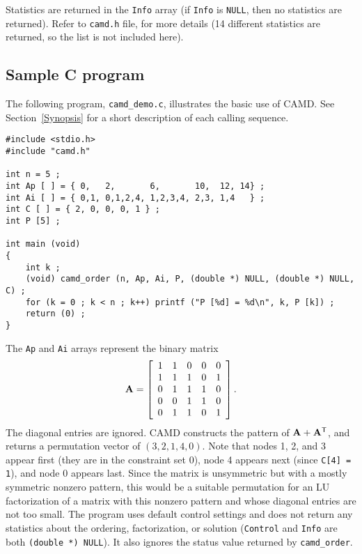 \documentclass[11pt]{article}
\newcommand{\m}[1]{{\bf{#1}}}       %
\newcommand{\tr}{^{\sf T}}          %
\begin{document}
Statistics are returned in the {\tt Info} array
(if {\tt Info} is {\tt NULL}, then no statistics are returned).
Refer to {\tt camd.h} file, for more details
(14 different statistics are returned, so the list is not included here).

\subsection{Sample C program}

The following program, {\tt camd\_demo.c}, illustrates the basic use of CAMD.
See Section~\ref{Synopsis} for a short description
of each calling sequence.

{\footnotesize
\begin{verbatim}
#include <stdio.h>
#include "camd.h"

int n = 5 ;
int Ap [ ] = { 0,   2,       6,       10,  12, 14} ;
int Ai [ ] = { 0,1, 0,1,2,4, 1,2,3,4, 2,3, 1,4   } ;
int C [ ] = { 2, 0, 0, 0, 1 } ;
int P [5] ;

int main (void)
{
    int k ;
    (void) camd_order (n, Ap, Ai, P, (double *) NULL, (double *) NULL, C) ;
    for (k = 0 ; k < n ; k++) printf ("P [%d] = %d\n", k, P [k]) ;
    return (0) ;
}

\end{verbatim}
}

The {\tt Ap} and {\tt Ai} arrays represent the binary matrix
\[
\m{A} = \left[
\begin{array}{rrrrr}
 1 &  1 &  0 &  0 &  0 \\
 1 &  1 &  1 &  0 &  1 \\
 0 &  1 &  1 &  1 &  0 \\
 0 &  0 &  1 &  1 &  0 \\
 0 &  1 &  1 &  0 &  1 \\
\end{array}
\right].
\]
The diagonal entries are ignored.
%
CAMD constructs the pattern of $\m{A}+\m{A}\tr$,
and returns a permutation vector of $(3, 2, 1, 4, 0)$.
Note that nodes 1, 2, and 3 appear first (they are in the constraint set 0),
node 4 appears next (since {\tt C[4] = 1}), and node 0 appears last.
%
Since the matrix is unsymmetric but with a mostly symmetric nonzero
pattern, this would be a suitable permutation for an LU factorization of a
matrix with this nonzero pattern and whose diagonal entries are not too small.
The program uses default control settings and does not return any statistics
about the ordering, factorization, or solution ({\tt Control} and {\tt Info}
are both {\tt (double *) NULL}).  It also ignores the status value returned by
{\tt camd\_order}.
\end{document}
